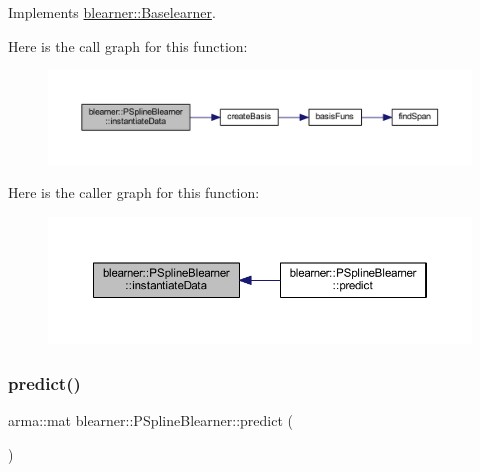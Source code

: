 Implements \hyperlink{classblearner_1_1_baselearner_af01f1b8c4540927705ff79c3649489f7}{blearner\+::\+Baselearner}.

Here is the call graph for this function\+:\nopagebreak
\begin{figure}[H]
\begin{center}
\leavevmode
\includegraphics[width=350pt]{classblearner_1_1_p_spline_blearner_ac0604daac451678e67a6a2ac60dd1b01_cgraph}
\end{center}
\end{figure}
Here is the caller graph for this function\+:\nopagebreak
\begin{figure}[H]
\begin{center}
\leavevmode
\includegraphics[width=350pt]{classblearner_1_1_p_spline_blearner_ac0604daac451678e67a6a2ac60dd1b01_icgraph}
\end{center}
\end{figure}
\mbox{\label{classblearner_1_1_p_spline_blearner_aa46e4474a352876fbfad64921254f6d5}} 
\subsubsection{\texorpdfstring{predict()}{predict()}\hspace{0.1cm}{\footnotesize\ttfamily [1/2]}}
{\footnotesize\ttfamily arma\+::mat blearner\+::\+P\+Spline\+Blearner\+::predict (\begin{DoxyParamCaption}{ }\end{DoxyParamCaption})\hspace{0.3cm}{\ttfamily [virtual]}}




